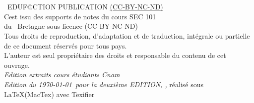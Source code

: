 


\newpage

~\vfill
\thispagestyle{empty}

\INFOGitHubS

\noindent {\Huge\ccbyncndeu}\\ 

\noindent \the\year~EDUF@CTION PUBLICATION \href{https://creativecommons.org/licenses/by-nc-nd/2.0/fr/}{(CC-BY-NC-ND)}\\ %

\noindent C\edoc est issu des supports de notes du cours SEC 101\\ 
du \uUniversity ~Bretagne sous licence (CC-BY-NC-ND)\\






\noindent Tous droits de reproduction, d’adaptation et de traduction, intégrale ou partielle de ce document réservés pour tous pays.\\

\noindent L’auteur est seul propriétaire des droits et responsable du contenu de cet ouvrage.\\

\noindent \textit{Edition extraits cours étudiants Cnam} \\

\noindent \textit{Edition du \today~pour la deuxième EDITION,  \printer, } réalisé sous \LaTeX (MacTex) avec Texifier \faApple


